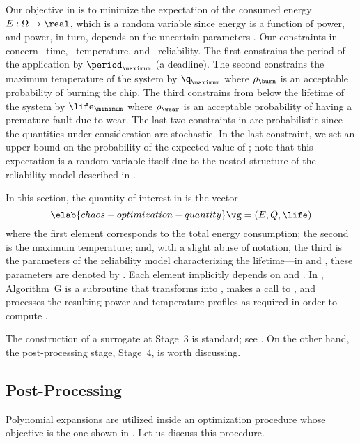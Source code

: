 Our objective in  is to minimize the
expectation of the consumed energy $E: \Omega \to \real$, which is a random
variable since energy is a function of power, and power, in turn, depends on the
uncertain parameters \vu. Our constraints in
 concern \one~time, \two~temperature, and
\three~reliability. The first constrains the period of the application by
$\period_\maximum$ (a deadline). The second constrains the maximum temperature
of the system by $\q_\maximum$ where $\rho_\burn$ is an acceptable probability
of burning the chip. The third constrains from below the lifetime of the system
by $\life_\minimum$ where $\rho_\wear$ is an acceptable probability of having a
premature fault due to wear. The last two constraints in
 are probabilistic since the quantities
under consideration are stochastic. In the last constraint, we set an upper
bound on the probability of the expected value of \life; note that this
expectation is a random variable itself due to the nested structure of the
reliability model described in .

In this section, the quantity of interest \g in  is the
vector
\begin{equation} \elab{chaos-optimization-quantity}
  \vg = (E, Q, \life)
\end{equation}
where the first element corresponds to the total energy consumption; the second
is the maximum temperature; and, with a slight abuse of notation, the third is
the parameters of the reliability model characterizing the lifetime---in
 and , these parameters
are denoted by \vg. Each element implicitly depends on \schedule and \vu. In
, Algorithm~G is a subroutine that transforms \vz into
\vu, makes a call to , and
processes the resulting power and temperature profiles as required in order to
compute \vg.

The construction of a surrogate at Stage~3 is standard; see
. On the other hand, the post-processing stage,
Stage~4, is worth discussing.

\subsection{Post-Processing}

Polynomial expansions are utilized inside an optimization procedure whose
objective is the one shown in . Let us
discuss this procedure.

